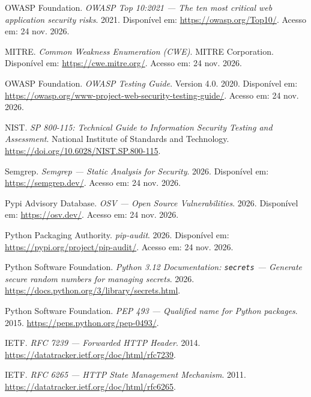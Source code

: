 \documentclass[12pt,a4paper]{article}
\begin{document}
\begin{enumerate}[label={[\arabic*]}]
  \item OWASP Foundation. \textit{OWASP Top 10:2021 --- The ten most critical
  web application security risks}. 2021. Disponível em:
  \url{https://owasp.org/Top10/}. Acesso em: 24 nov. 2026.

  \item MITRE. \textit{Common Weakness Enumeration (CWE)}. MITRE Corporation.
  Disponível em: \url{https://cwe.mitre.org/}. Acesso em: 24 nov. 2026.

  \item OWASP Foundation. \textit{OWASP Testing Guide}. Version 4.0. 2020.
  Disponível em: \url{https://owasp.org/www-project-web-security-testing-guide/}.
  Acesso em: 24 nov. 2026.

  \item NIST. \textit{SP 800-115: Technical Guide to Information Security
  Testing and Assessment}. National Institute of Standards and Technology.
  \url{https://doi.org/10.6028/NIST.SP.800-115}.

  \item Semgrep. \textit{Semgrep --- Static Analysis for Security}. 2026.
  Disponível em: \url{https://semgrep.dev/}. Acesso em: 24 nov. 2026.

  \item Pypi Advisory Database. \textit{OSV --- Open Source Vulnerabilities}.
  2026. Disponível em: \url{https://osv.dev/}. Acesso em: 24 nov. 2026.

  \item Python Packaging Authority. \textit{pip-audit}. 2026. Disponível em:
  \url{https://pypi.org/project/pip-audit/}. Acesso em: 24 nov. 2026.

  \item Python Software Foundation. \textit{Python 3.12 Documentation:
  \texttt{secrets} --- Generate secure random numbers for managing secrets}.
  2026. \url{https://docs.python.org/3/library/secrets.html}.

  \item Python Software Foundation. \textit{PEP 493 --- Qualified name for
  Python packages}. 2015. \url{https://peps.python.org/pep-0493/}.

  \item IETF. \textit{RFC 7239 --- Forwarded HTTP Header}. 2014.
  \url{https://datatracker.ietf.org/doc/html/rfc7239}.

  \item IETF. \textit{RFC 6265 --- HTTP State Management Mechanism}. 2011.
  \url{https://datatracker.ietf.org/doc/html/rfc6265}.


\end{enumerate}
\end{document}
